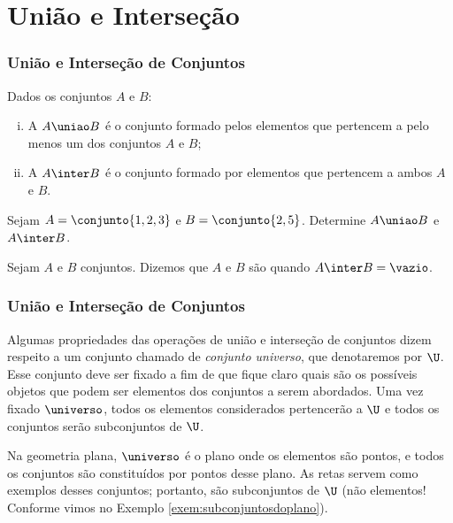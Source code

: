 \section{União e Interseção}


\begin{frame}
	\frametitle{União e Interseção de Conjuntos} 

	\begin{definicao}
		Dados os conjuntos $A$ e $B$:
		\begin{enumerate}[i.]
			\item A  $A \uniao B$ é o conjunto formado pelos elementos que pertencem a pelo menos um dos conjuntos $A$ e $B$;
			\item A  $A \inter B$ é o conjunto formado por elementos que pertencem a ambos $A$ e $B$.
		\end{enumerate}
	\end{definicao}\pause

	\begin{exemplo}
		Sejam $A = \conjunto{1, 2, 3}$ e $B = \conjunto{2, 5}$. Determine $A \uniao B$ e $A \inter B$.
	\end{exemplo}\pause

	\begin{definicao}
		Sejam  $A$ e $B$ conjuntos. Dizemos que $A$ e $B$ são  quando $A \inter B = \vazio$.
	\end{definicao}
\end{frame}


\begin{frame}
	\frametitle{União e Interseção de Conjuntos}
	Algumas propriedades das operações de união e interseção de conjuntos dizem respeito a um conjunto chamado de \emph{conjunto universo}, que denotaremos por $\U$. Esse conjunto deve ser fixado a fim de que fique claro quais são os possíveis objetos que podem ser elementos dos conjuntos a serem abordados. Uma vez fixado $\universo$, todos os elementos considerados pertencerão a $\U$ e todos os conjuntos serão subconjuntos de $\U$. 

\begin{exemplo}
	Na geometria plana, $\universo$ é o plano onde os elementos são pontos, e todos os conjuntos são constituídos por pontos desse plano. As retas servem como exemplos desses conjuntos; portanto, são subconjuntos de $\U$ (não elementos! Conforme vimos no Exemplo \ref{exem:subconjuntosdoplano}).
\end{exemplo}
\end{frame}

